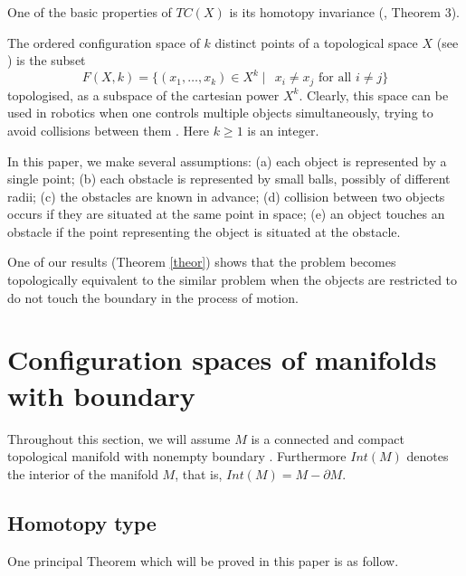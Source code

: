 \documentclass{amsart}
\theoremstyle{definition}
\numberwithin{equation}{section}
\begin{document}
One of the basic properties of $TC(X)$ is its homotopy invariance (\cite{farber2003topological}, Theorem 3).

The ordered configuration space of $k$ distinct points of a topological space $X$ (see \cite{fadell1962configuration}) is the subset 
 \[F(X,k)=\{(x_1,\ldots,x_k)\in X^k\mid ~~x_i\neq x_j\text{ for all } i\neq j \}\] topologised, as a subspace of the cartesian power $X^k$. Clearly, this space can be used in robotics when one controls multiple objects simultaneously, trying to avoid collisions between them \cite{farber2008invitation}. Here $k\geq 1$ is an integer.

In this paper, we make several assumptions: (a) each object is represented by a single point; (b) each obstacle is represented by small balls, possibly of different radii; (c) the obstacles are known in advance; (d) collision between two objects occurs if they are situated at the same point in space; (e) an object touches an obstacle if the point representing the object is situated at the obstacle.

One of our results (Theorem \ref{theor}) shows that the problem becomes topologically equivalent to the similar problem when the objects are restricted to do not touch the boundary in the process of motion.


 


\section{\bf Configuration spaces of manifolds with boundary}

Throughout this section, we will assume $M$ is a connected and compact topological manifold with nonempty boundary \cite{lee2012introduction}. Furthermore $Int(M)$ denotes the interior of the manifold $M$, that is, $Int(M)=M- \partial M$.

\subsection{Homotopy type}
 
 One principal Theorem which will be proved in this paper is as follow.
 
\end{document}
